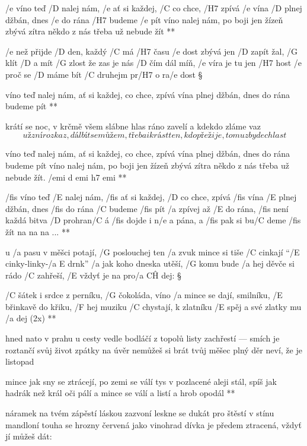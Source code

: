 \rr





\R  /e víno teď /D nalej nám, /e ať si každej, /C co chce, /H7 zpívá
    /e vína /D plnej džbán, dnes /e do rána /H7 budeme /e pít
    víno nalej nám, po boji jen žízeň zbývá
    zítra někdo z nás třeba už nebude žít **

/e než přijde /D den, každý /C má /H7 času /e dost
zbývá jen /D zapít žal, /G klít /D a mít /G zlost
že zas je nás /D čím dál míň, /e víra je tu jen /H7 host
/e proč se /D máme bít /C druhejm pr/H7 o ra/e dost \S

\R  víno teď nalej nám, ať si každej, co chce, zpívá
    vína plnej džbán, dnes do rána budeme pít **

krátí se noc, v krčmě všem slábne hlas
ráno zavelí a kdekdo zláme vaz
\[ už zní rozkaz, dál bít se můžem, třeba i krást
ten, kdo přežije, tomu zbyde chlast \]

\R  víno teď nalej nám, ať si každej, co chce, zpívá
    vína plnej džbán, dnes do rána budeme pít
    víno nalej nám, po boji jen žízeň zbývá
    zítra někdo z nás třeba už nebude žít. /{emi d emi h7 emi} **


\R  /fis víno teď /E nalej nám, /fis ať si každej, /D co chce, zpívá
    /fis vína /E plnej džbán, dnes /fis do rána /C budeme /fis pít
    /a zpívej až /E do rána, /fis není každá bitva /D prohran/C á
    /fis dojde i n/e a pána, a /fis pak si bu/C deme /fis žít
    na na na ... **




u /a pasu v měšci potají, /G poslouchej ten /a zvuk
mince si tiše /C cinkají ``/E cinky-linky-/{a E} drnk''
/a jak koho dneska utěší, /G komu bude /a hej
děvče si rádo /C zahřeší, /E vždyť je na pro/{a C\^H} dej: \S

\R  /C šátek i srdce z perníku, /G čokoláda, víno
    /a mince se dají, smilníku, /E břinkavě do křiku, /F hej
    muziku /C chystají, k zlatníku /E spěj a své zlatky mu /a dej (2x) **

hned nato v prahu u cesty vedle bodláčí
z topolů listy zachřestí --- smích je roztančí
svůj život zpátky na úvěr nemůžeš si brát
tvůj měšec plný děr neví, že je listopad

\R  mince jak sny se ztrácejí, po zemi se válí
    tys v pozlacené aleji stál, spíš jak hadrák než král
    oči pálí a mince se válí a listí a hrob opodál **

náramek na tvém zápěstí láskou zazvoní
leskne se dukát pro štěstí v stínu mandloní
touha se hrozny červená jako vinohrad
dívka je předem ztracená, vždyť jí můžeš dát:

